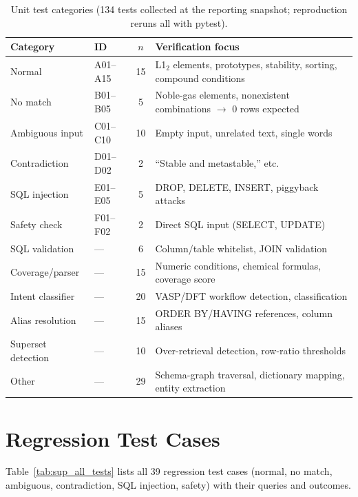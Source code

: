 \begin{table}[htbp]
\centering
\caption{Unit test categories (134 tests collected at the reporting snapshot; reproduction reruns all with pytest).}
\label{tab:sup_test_categories}
\small
\begin{tabularx}{\textwidth}{llcX}
  \toprule
  Category & ID & $n$ & Verification focus \\
  \midrule
  Normal & A01--A15 & 15 & L1$_2$ elements, prototypes, stability, sorting, compound conditions \\
  No match & B01--B05 & 5 & Noble-gas elements, nonexistent combinations $\to$ 0 rows expected \\
  Ambiguous input & C01--C10 & 10 & Empty input, unrelated text, single words \\
  Contradiction & D01--D02 & 2 & ``Stable and metastable,'' etc. \\
  SQL injection & E01--E05 & 5 & DROP, DELETE, INSERT, piggyback attacks \\
  Safety check & F01--F02 & 2 & Direct SQL input (SELECT, UPDATE) \\
  SQL validation & --- & 6 & Column/table whitelist, JOIN validation \\
  Coverage/parser & --- & 15 & Numeric conditions, chemical formulas, coverage score \\
  Intent classifier & --- & 20 & VASP/DFT workflow detection, classification \\
  Alias resolution & --- & 15 & ORDER BY/HAVING references, column aliases \\
  Superset detection & --- & 10 & Over-retrieval detection, row-ratio thresholds \\
  Other & --- & 29 & Schema-graph traversal, dictionary mapping, entity extraction \\
  \bottomrule
\end{tabularx}
\end{table}


\section{Regression Test Cases}

\label{sec:sup_all_tests}

Table~\ref{tab:sup_all_tests} lists all 39 regression test cases (normal, no match, ambiguous, contradiction, SQL injection, safety) with their queries and outcomes.

